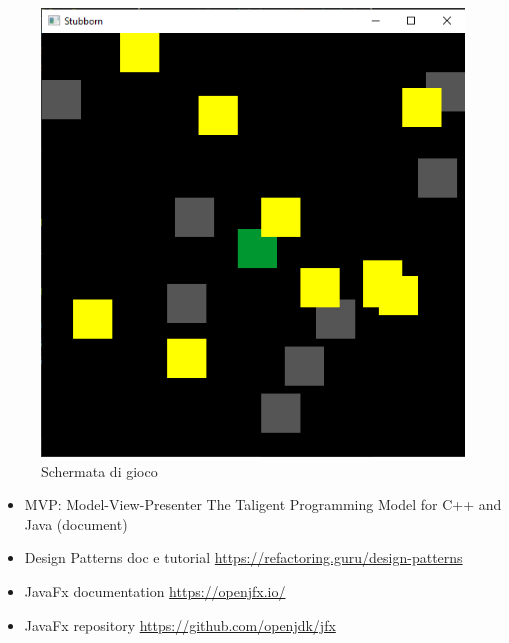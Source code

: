 \documentclass[a4paper,12pt]{report}
\begin{document}
\begin{figure}[H]
\centering{}
\includegraphics[width=\textwidth,height=\textheight,keepaspectratio]{img/game.png}
\caption{Schermata di gioco}
\label{img:game}
\end{figure}

\begin{itemize}
    \item MVP: Model-View-Presenter The Taligent Programming Model for C++ and Java (document) 
    \item Design Patterns doc e tutorial \url{https://refactoring.guru/design-patterns}
    \item JavaFx documentation \url{https://openjfx.io/}  
    \item JavaFx repository \url{https://github.com/openjdk/jfx}
\end{itemize}
\end{document}
